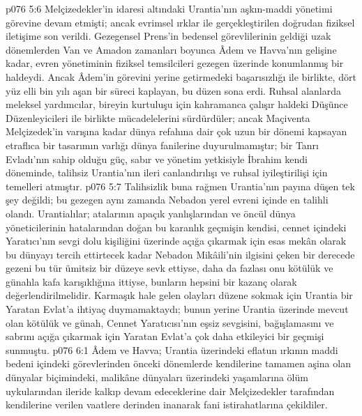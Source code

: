 \vs p076 5:6 Melçizedekler’in idaresi altındaki Urantia’nın aşkın\hyp{}maddi yönetimi görevine devam etmişti; ancak evrimsel ırklar ile gerçekleştirilen doğrudan fiziksel iletişime son verildi. Gezegensel Prens’in bedensel görevlilerinin geldiği uzak dönemlerden Van ve Amadon zamanları boyunca Âdem ve Havva’nın gelişine kadar, evren yönetiminin fiziksel temsilcileri gezegen üzerinde konumlanmış bir haldeydi. Ancak Âdem’in görevini yerine getirmedeki başarısızlığı ile birlikte, dört yüz elli bin yılı aşan bir süreci kaplayan, bu düzen sona erdi. Ruhsal alanlarda meleksel yardımcılar, bireyin kurtuluşu için kahramanca çalışır haldeki Düşünce Düzenleyicileri ile birlikte mücadelelerini sürdürdüler; ancak Maçiventa Melçizedek’in varışına kadar dünya refahına dair çok uzun bir dönemi kapsayan etraflıca bir tasarımın varlığı dünya fanilerine duyurulmamıştır; bir Tanrı Evladı’nın sahip olduğu güç, sabır ve yönetim yetkisiyle İbrahim kendi döneminde, talihsiz Urantia’nın ileri canlandırılışı ve ruhsal iyileştirilişi için temelleri atmıştır.
\vs p076 5:7 Talihsizlik buna rağmen Urantia’nın payına düşen tek şey değildi; bu gezegen aynı zamanda Nebadon yerel evreni içinde en talihli olandı. Urantialılar; atalarının apaçık yanlışlarından ve öncül dünya yöneticilerinin hatalarından doğan bu karanlık geçmişin kendisi, cennet içindeki Yaratıcı’nın sevgi dolu kişiliğini üzerinde açığa çıkarmak için esas mekân olarak bu dünyayı tercih ettirtecek kadar Nebadon Mikâili’nin ilgisini çeken bir derecede gezeni bu tür ümitsiz bir düzeye sevk ettiyse, daha da fazlası onu kötülük ve günahla kafa karışıklığına ittiyse, bunların hepsini bir kazanç olarak değerlendirilmelidir. Karmaşık hale gelen olayları düzene sokmak için Urantia bir Yaratan Evlat’a ihtiyaç duymamaktaydı; bunun yerine Urantia üzerinde mevcut olan kötülük ve günah, Cennet Yaratıcısı’nın eşsiz sevgisini, bağışlamasını ve sabrını açığa çıkarmak için Yaratan Evlat’a çok daha etkileyici bir geçmişi sunmuştu.
\vs p076 6:1 Âdem ve Havva; Urantia üzerindeki eflatun ırkının maddi bedeni içindeki görevlerinden önceki dönemlerde kendilerine tamamen aşina olan dünyalar biçimindeki, malikâne dünyaları üzerindeki yaşamlarına ölüm uykularından ileride kalkıp devam edeceklerine dair Melçizedekler tarafından kendilerine verilen vaatlere derinden inanarak fani istirahatlarına çekildiler.

